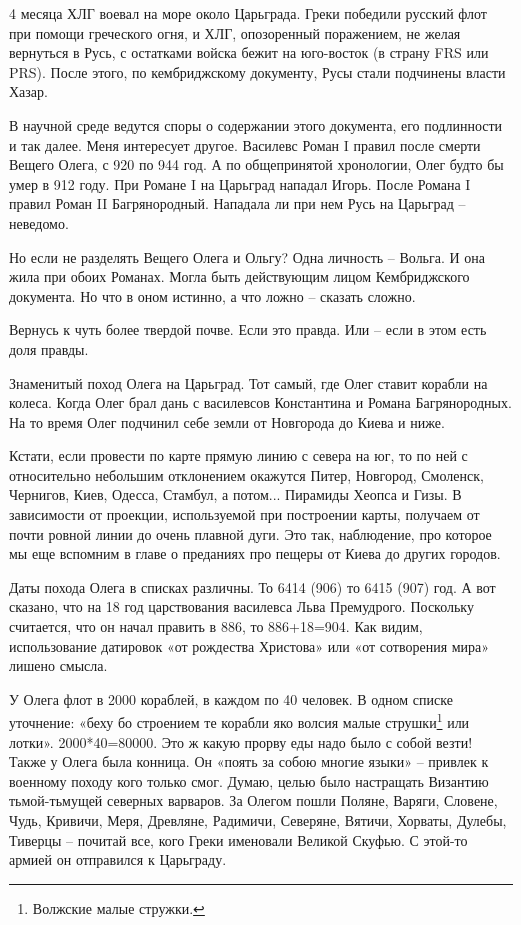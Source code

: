 4 месяца ХЛГ воевал на море около Царьграда. Греки победили русский флот при помощи греческого огня, и ХЛГ, опозоренный поражением, не желая вернуться в Русь, с остатками войска бежит на юго-восток (в страну FRS или PRS). После этого, по кембриджскому документу, Русы стали подчинены власти Хазар. 

В научной среде ведутся споры о содержании этого документа, его подлинности и так далее. Меня интересует другое. Василевс Роман I правил после смерти Вещего Олега, с 920 по 944 год. А по общепринятой хронологии, Олег будто бы умер в 912 году. При Романе I на Царьград нападал Игорь. После Романа I правил Роман II Багрянородный. Нападала ли при нем Русь на Царьград – неведомо.

Но если не разделять Вещего Олега и Ольгу? Одна личность – Вольга. И она жила при обоих Романах. Могла быть действующим лицом Кембриджского документа. Но что в оном истинно, а что ложно – сказать сложно.


Вернусь к чуть более твердой почве. Если это правда. Или – если в этом есть доля правды.

Знаменитый поход Олега на Царьград. Тот самый, где Олег ставит корабли на колеса. Когда Олег брал дань с василевсов Константина и Романа Багрянородных. На то время Олег подчинил себе земли от Новгорода до Киева и ниже. 

Кстати, если провести по карте прямую линию с севера на юг, то по ней с относительно небольшим отклонением окажутся Питер, Новгород, Смоленск, Чернигов, Киев, Одесса, Стамбул, а потом... Пирамиды Хеопса и Гизы. В зависимости от проекции, используемой при построении карты, получаем от почти ровной линии до очень плавной дуги. Это так, наблюдение, про которое мы еще вспомним в главе о преданиях про пещеры от Киева до других городов.

Даты похода Олега в списках различны. То 6414 (906) то 6415 (907) год. А вот сказано, что на 18 год царствования василевса Льва Премудрого. Поскольку считается, что он начал править в 886, то 886+18=904. Как видим, использование датировок «от рождества Христова» или «от сотворения мира» лишено смысла.

У Олега флот в 2000 кораблей, в каждом по 40 человек. В одном списке уточнение: «беху бо строением те корабли яко волсия малые струшки\footnote{Волжские малые стружки.} или лотки». 2000*40=80000. Это ж какую прорву еды надо было с собой везти! Также у Олега была конница. Он «поять за собою многие языки» – привлек к военному походу кого только смог. Думаю, целью было настращать Византию тьмой-тьмущей северных варваров. За Олегом пошли Поляне, Варяги, Словене, Чудь, Кривичи, Меря, Древляне, Радимичи, Северяне, Вятичи, Хорваты, Дулебы, Тиверцы – почитай все, кого Греки именовали Великой Скуфью. С этой-то армией он отправился к Царьграду.

